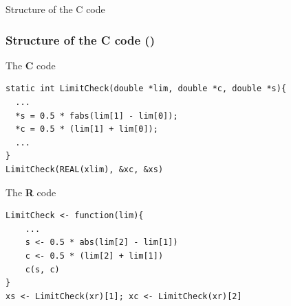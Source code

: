 \documentclass{beamer}
\begin{document}






\begin{frame}[fragile]
\begin{center}
\Huge Structure of the C code
\end{center}
\end{frame}


\begin{frame}[fragile]
\frametitle{Structure of the \textbf{C} code ()}





\begin{block}{The \textbf{C} code}
\begin{lstlisting}[basicstyle=\ttfamily\scriptsize]
static int LimitCheck(double *lim, double *c, double *s){
  ...
  *s = 0.5 * fabs(lim[1] - lim[0]);
  *c = 0.5 * (lim[1] + lim[0]);
  ...
}
LimitCheck(REAL(xlim), &xc, &xs)
\end{lstlisting}
\end{block}


\begin{block}{The \textbf{R} code}
\begin{lstlisting}[basicstyle=\ttfamily\scriptsize]
LimitCheck <- function(lim){
    ...
    s <- 0.5 * abs(lim[2] - lim[1])
    c <- 0.5 * (lim[2] + lim[1])
    c(s, c)
}
xs <- LimitCheck(xr)[1]; xc <- LimitCheck(xr)[2]
\end{lstlisting}
\end{block}

\end{frame}
\end{document}
